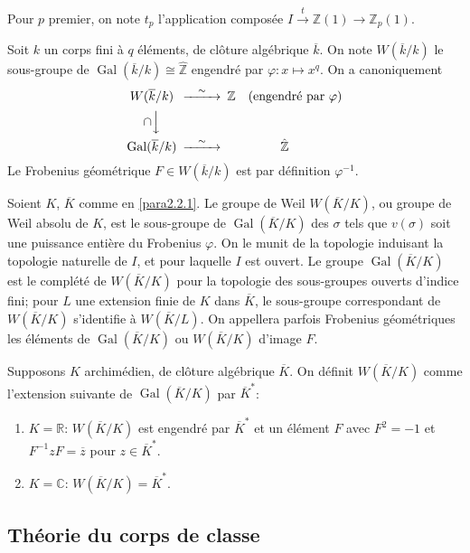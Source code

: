 \documentclass[11pt,a4paper]{amsart}
\theoremstyle{plain}
\theoremstyle{definition}
\DeclareMathOperator{\Gal}{Gal}
\newcommand{\dbZ}{\mathbb{Z}}
\newcommand{\dbR}{\mathbb{R}}
\newcommand{\dbC}{\mathbb{C}}
\newenvironment{para}{\par\noindent}{\par}
\newcommand{\ov}[1]{\overline{#1}}
\begin{document}
\begin{para}
Pour $p$ premier, on note $t_{p}$ l'application compos\'ee $I \xrightarrow{t} \dbZ(1) \to \dbZ_{p}(1)$.
\end{para}

\begin{para}
Soit $k$ un corps fini \`a $q$ \'el\'ements, de cl\^oture alg\'ebrique $\ov{k}$. On note $W(\ov{k}/k)$ le sous-groupe de $\Gal(\ov{k}/k) \cong \hat{\dbZ}$ engendr\'e par $\varphi: x \mapsto x^{q}$. On a canoniquement
\[
\begin{CD}
W(\ov{k}/k) @>{\sim}>> \dbZ \quad (\text{engendr\'e par } \varphi) \\
\cap @VVV \\
\Gal(\ov{k}/k) @>{\sim}>> \hat{\dbZ}
\end{CD}
\]
Le Frobenius g\'eom\'etrique $F \in W(\ov{k}/k)$ est par d\'efinition $\varphi^{-1}$.
\end{para}

\begin{para}
Soient $K$, $\ov{K}$ comme en \ref{para2.2.1}. Le groupe de Weil $W(\ov{K}/K)$, ou groupe de Weil absolu de $K$, est le sous-groupe de $\Gal(\ov{K}/K)$ des $\sigma$ tels que $v(\sigma)$ soit une puissance enti\`ere du Frobenius $\varphi$. On le munit de la topologie induisant la topologie naturelle de $I$, et pour laquelle $I$ est ouvert. Le groupe $\Gal(\ov{K}/K)$ est le compl\'et\'e de $W(\ov{K}/K)$ pour la topologie des sous-groupes ouverts d'indice fini; pour $L$ une extension finie de $K$ dans $\ov{K}$, le sous-groupe correspondant de $W(\ov{K}/K)$ s'identifie \`a $W(\ov{K}/L)$. On appellera parfois Frobenius g\'eom\'etriques les \'el\'ements de $\Gal(\ov{K}/K)$ ou $W(\ov{K}/K)$ d'image $F$.
\end{para}

\begin{para}
Supposons $K$ archim\'edien, de cl\^oture alg\'ebrique $\ov{K}$. On d\'efinit $W(\ov{K}/K)$ comme l'extension suivante de $\Gal(\ov{K}/K)$ par $\ov{K}^{*}$:
\begin{enumerate}
\item[$1)$] $K = \dbR$: $W(\ov{K}/K)$ est engendr\'e par $\ov{K}^{*}$ et un \'el\'ement $F$ avec $F^{2} = -1$ et $F^{-1}zF = \ov{z}$ pour $z \in \ov{K}^{*}$.
\item[$2)$] $K = \dbC$: $W(\ov{K}/K) = \ov{K}^{*}$.
\end{enumerate}
\end{para}

\subsection{Th\'eorie du corps de classe}
\end{document}

